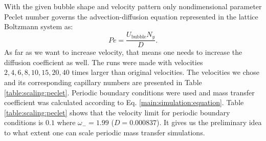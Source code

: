 \documentclass{article}
\newcommand{\beq}{\begin{equation}}
\newcommand{\feq}{\end{equation}}
\newcommand{\ububble}{U_{\mathrm{bubble}}}
\newcommand{\omegaminus}{\omega_{-}}
\begin{document}
With the given bubble shape and velocity pattern only nondimensional parameter Peclet number governs
the advection-diffusion equation represented in the lattice Boltzmann system as:
\beq
Pe=\frac{\ububble N_y}{D}.
\feq
As far as we want to increase velocity, that
means one needs to increase the diffusion coefficient as well. The runs were made with
velocities $2,4,6,8,10,15,20,40$ times larger than original velocities. The velocities we chose and
its corresponding capillary numbers are presented in Table \ref{table:scaling:peclet}. Periodic
boundary conditions were used and mass transfer coefficient was calculated according to Eq.
\ref{main:simulation:equation}. Table \ref{table:scaling:peclet} shows that the velocity limit
for  periodic boundary conditions is $0.1$ where $\omegaminus=1.99$ ($D=0.000837$). It gives us the
preliminary idea to what extent one can scale periodic mass transfer simulations. 
\end{document}
